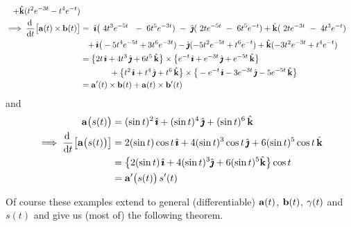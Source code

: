 \begin{eg}
\begin{align*}
   +\hk(t^2 e^{-3t}-t^4 e^{-t})
\\
\implies \diff{}{t}\big[\va(t)\times\vb(t)\big]
&=\ \hi\big(\ 4t^3 e^{-5t}\ \ -\ 6t^5 e^{-3t}) 
  \ -\ \hj(\ 2t e^{-5t}\ -\  6t^5 e^{-t}) 
   +\hk(\ 2t e^{-3t}\ -\ 4t^3 e^{-t}) \\&\hskip0.1in
 +\hi\big(-5t^4 e^{-5t}+3t^6 e^{-3t}) 
  -\hj(-5t^2 e^{-5t}+ t^6 e^{-t}) 
   +\hk(-3t^2 e^{-3t}+t^4 e^{-t})
\\
&=\big\{2t\,\hi+4t^3\,\hj+6t^5\,\hk\big\}\times
           \big\{e^{-t}\,\hi + e^{-3t}\,\hj + e^{-5t}\,\hk\big\}\\&\hskip0.5in
  +\big\{t^2\,\hi + t^4\,\hj + t^6\,\hk\big\}\times
         \big\{-e^{-t}\,\hi-3e^{-3t}\,\hj-5e^{-5t}\,\hk\big\}
\\
&=\va'(t)\times\vb(t)+\va(t)\times\vb'(t)
\end{align*}
and
\begin{align*}
\va\big(s(t)\big)
&=(\sin t)^2\,\hi +(\sin t)^4\,\hj + (\sin t)^6\,\hk
\\
\implies \diff{}{t}\big[\va\big(s(t)\big)\big]
&=2(\sin t)\cos t\,\hi +4(\sin t)^3\cos t\,\hj + 6(\sin t)^5\cos t\,\hk
\\
&=\big\{2(\sin t)\,\hi +4(\sin t)^3\hj + 6(\sin t)^5\hk\big\}\cos t 
\\
&=\va'\big(s(t)\big)\,s'(t)
\end{align*}
\end{eg}

Of course these examples extend to general (differentiable)
$\mathbf{a}(t)$, $\mathbf{b}(t)$, $\gamma(t)$ and $s(t)$ and give us (most of) the following theorem.

